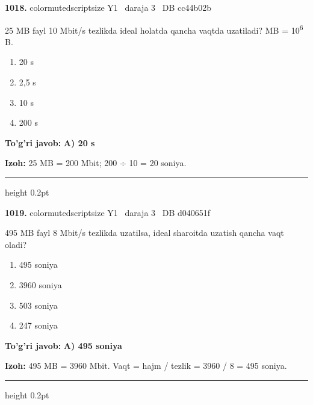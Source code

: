 \documentclass[10pt,a4paper,oneside]{article}
\begin{document}
\noindent\textbf{\color{ink}1018.}  {color{muted}scriptsize Y1 \textbullet\ daraja 3 \textbullet\ DB cc44b02b}
\par
25 MB fayl 10 Mbit/s tezlikda ideal holatda qancha vaqtda uzatiladi? MB = 10\textsuperscript{6} B.
\begin{enumerate}[label=\Alph*),leftmargin=9mm]
\item 20 s
\item 2,5 s
\item 10 s
\item 200 s
\end{enumerate}
\begin{tcolorbox}[enhanced,breakable,colback=teal!4,colframe=teal!50!black,boxrule=0.5pt,arc=1.1mm,left=3mm,right=3mm,top=1.7mm,bottom=1.7mm,before skip=2mm,after skip=2mm]
\textbf{\color{teal}To'g'ri javob:} \textbf{A) 20 s}
\par\smallskip
\textbf{Izoh:} 25 MB = 200 Mbit; 200 \ensuremath{\div} 10 = 20 soniya.
\end{tcolorbox}
\vspace{2mm}\hrule height 0.2pt \vspace{3mm}

\noindent\textbf{\color{ink}1019.}  {color{muted}scriptsize Y1 \textbullet\ daraja 3 \textbullet\ DB d040651f}
\par
495 MB fayl 8 Mbit/s tezlikda uzatilsa, ideal sharoitda uzatish qancha vaqt oladi?
\begin{enumerate}[label=\Alph*),leftmargin=9mm]
\item 495 soniya
\item 3960 soniya
\item 503 soniya
\item 247 soniya
\end{enumerate}
\begin{tcolorbox}[enhanced,breakable,colback=teal!4,colframe=teal!50!black,boxrule=0.5pt,arc=1.1mm,left=3mm,right=3mm,top=1.7mm,bottom=1.7mm,before skip=2mm,after skip=2mm]
\textbf{\color{teal}To'g'ri javob:} \textbf{A) 495 soniya}
\par\smallskip
\textbf{Izoh:} 495 MB = 3960 Mbit. Vaqt = hajm / tezlik = 3960 / 8 = 495 soniya.
\end{tcolorbox}
\vspace{2mm}\hrule height 0.2pt \vspace{3mm}
\end{document}
